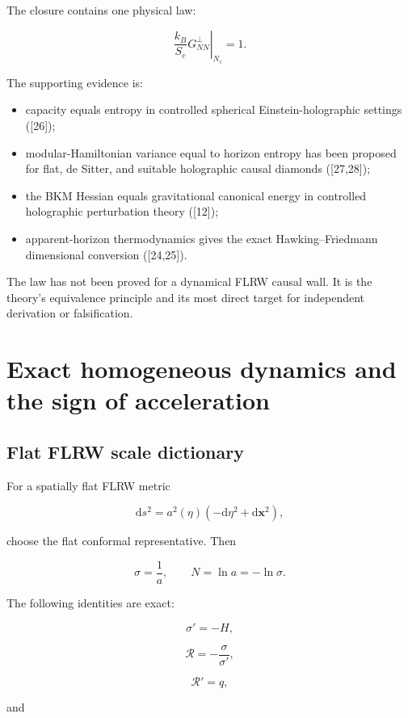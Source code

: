 \documentclass[
  11pt,
  letterpaper,
]{article}
\providecommand{\tightlist}{%
  \setlength{\itemsep}{0pt}\setlength{\parskip}{0pt}}
\begin{document}
The closure contains one physical law:

\[
\boxed{
\left.
\frac{k_B}{S_c}G^{\perp}_{NN}
\right|_{N_c}=1.
}
\]

The supporting evidence is:

\begin{itemize}
\tightlist
\item
  capacity equals entropy in controlled spherical Einstein-holographic
  settings ({[}26{]});
\item
  modular-Hamiltonian variance equal to horizon entropy has been
  proposed for flat, de Sitter, and suitable holographic causal diamonds
  ({[}27,28{]});
\item
  the BKM Hessian equals gravitational canonical energy in controlled
  holographic perturbation theory ({[}12{]});
\item
  apparent-horizon thermodynamics gives the exact Hawking--Friedmann
  dimensional conversion ({[}24,25{]}).
\end{itemize}

The law has not been proved for a dynamical FLRW causal wall. It is the
theory's equivalence principle and its most direct target for
independent derivation or falsification.

\section{Exact homogeneous dynamics and the sign of
acceleration}\label{exact-homogeneous-dynamics-and-the-sign-of-acceleration}

\subsection{Flat FLRW scale
dictionary}\label{flat-flrw-scale-dictionary}

For a spatially flat FLRW metric

\[
\mathrm ds^2=a^2(\eta)(-\mathrm d\eta^2+\mathrm d\mathbf x^2),
\]

choose the flat conformal representative. Then

\[
\sigma=\frac1a,
\qquad
N=\ln a=-\ln\sigma.
\]

The following identities are exact:

\[
\boxed{\sigma'=-H,}
\]

\[
\boxed{\mathcal R=-\frac{\sigma}{\sigma'},}
\]

\[
\boxed{\mathcal R'=q,}
\]

and
\end{document}

